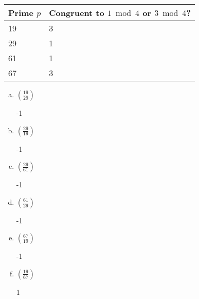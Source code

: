 \documentclass[12pt]{amsart}
\theoremstyle{plain}
\theoremstyle{definition}
\theoremstyle{remark}
\begin{document}
\begin{enumerate}[1.]
\begin{center}
\begin{tabular}{|p{1in}|p{3in}|}
			Prime $p$ & Congruent to $1 \bmod 4$ or $3 \bmod 4$?\\ \hline
			19 & 3\\
			29 & 1\\
			61 & 1\\
			67 & 3\\ \hline
			\end{tabular}
			\end{center}
		\begin{enumerate}[a.]
			\item $\left(\frac{19}{29}\right)$
				\begin{framed}
				-1
				\end{framed}
			\item $\left(\frac{29}{19}\right)$
				\begin{framed}
				-1
				\end{framed}
			\item $\left(\frac{29}{61}\right)$
				\begin{framed}
				-1
				\end{framed}
			\item $\left(\frac{61}{29}\right)$
				\begin{framed}
				-1
				\end{framed}
			\item $\left(\frac{67}{19}\right)$
				\begin{framed}
				-1
				\end{framed}
			\item $\left(\frac{19}{67}\right)$
				\begin{framed}
				1
				\end{framed}
		\end{enumerate}
\end{enumerate}
\end{document}

